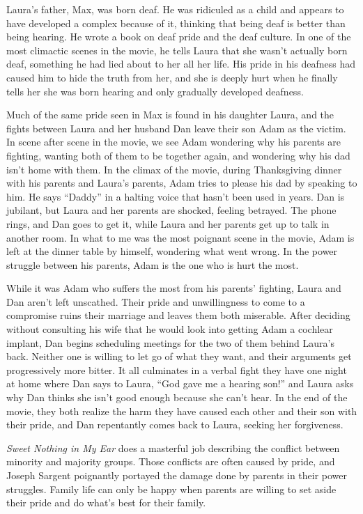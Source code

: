 \documentclass[onecolumn, 12pt]{article}
\begin{document}
Laura's father, Max, was born deaf.  He was ridiculed as a child and appears to
have developed a complex because of it, thinking that being deaf is better than
being hearing.  He wrote a book on deaf pride and the deaf culture.  In one of
the most climactic scenes in the movie, he tells Laura that she wasn't actually
born deaf, something he had lied about to her all her life.  His pride in his
deafness had caused him to hide the truth from her, and she is deeply hurt when
he finally tells her she was born hearing and only gradually developed
deafness.

Much of the same pride seen in Max is found in his daughter Laura, and the
fights between Laura and her husband Dan leave their son Adam as the victim.
In scene after scene in the movie, we see Adam wondering why his parents are
fighting, wanting both of them to be together again, and wondering why his dad
isn't home with them.  In the climax of the movie, during Thanksgiving dinner
with his parents and Laura's parents, Adam tries to please his dad by speaking
to him.  He says ``Daddy'' in a halting voice that hasn't been used in years.
Dan is jubilant, but Laura and her parents are shocked, feeling betrayed.  The
phone rings, and Dan goes to get it, while Laura and her parents get up to talk
in another room.  In what to me was the most poignant scene in the movie, Adam
is left at the dinner table by himself, wondering what went wrong.  In the
power struggle between his parents, Adam is the one who is hurt the most.

While it was Adam who suffers the most from his parents' fighting, Laura and
Dan aren't left unscathed.  Their pride and unwillingness to come to a
compromise ruins their marriage and leaves them both miserable.  After deciding
without consulting his wife that he would look into getting Adam a cochlear
implant, Dan begins scheduling meetings for the two of them behind Laura's
back.  Neither one is willing to let go of what they want, and their arguments
get progressively more bitter.  It all culminates in a verbal fight they have
one night at home where Dan says to Laura, ``God gave me a hearing son!'' and
Laura asks why Dan thinks she isn't good enough because she can't hear.  In the
end of the movie, they both realize the harm they have caused each other and
their son with their pride, and Dan repentantly comes back to Laura, seeking
her forgiveness.

\emph{Sweet Nothing in My Ear} does a masterful job describing the conflict
between minority and majority groups.  Those conflicts are often caused by
pride, and Joseph Sargent poignantly portayed the damage done by parents in
their power struggles.  Family life can only be happy when parents are willing
to set aside their pride and do what's best for their family.
\end{document}
